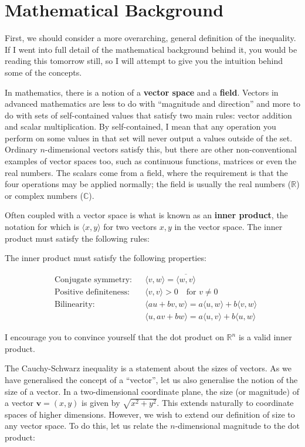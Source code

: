 \documentclass{article}
\begin{document}
\section*{Mathematical Background}

First, we should consider a more overarching, general definition of the inequality. If I went into full detail of the mathematical background behind it, you would be reading this tomorrow still, so I will attempt to give you the intuition behind some of the concepts.

In mathematics, there is a notion of a \textbf{vector space} and a \textbf{field}. Vectors in advanced mathematics are less to do with “magnitude and direction” and more to do with sets of self-contained values that satisfy two main rules: vector addition and scalar multiplication. By self-contained, I mean that any operation you perform on some values in that set will never output a values outside of the set. Ordinary $n$-dimensional vectors satisfy this, but there are other non-conventional examples of vector spaces too, such as continuous functions, matrices or even the real numbers. The scalars come from a field, where the requirement is that the four operations may be applied normally; the field is usually the real numbers ($\mathbb{R}$) or complex numbers ($\mathbb{C}$).

Often coupled with a vector space is what is known as an \textbf{inner product}, the notation for which is $\langle x,y \rangle$ for two vectors $x, y$ in the vector space. The inner product must satisfy the following rules:

The inner product must satisfy the following properties:

\begin{align*}
    &\text{Conjugate symmetry:} && \langle v, w \rangle = \overline{\langle w, v \rangle} \\
    &\text{Positive definiteness:} && \langle v, v \rangle > 0 \quad \text{for } v \neq 0 \\
    &\text{Bilinearity:} && \langle au + bv, w \rangle = a\langle u, w \rangle + b\langle v, w \rangle \\
    &&& \langle u, av + bw \rangle = a\langle u, v \rangle + b\langle u, w \rangle
\end{align*}

I encourage you to convince yourself that the dot product on $\mathbb{R}^n$ is a valid inner product.

The Cauchy-Schwarz inequality is a statement about the sizes of vectors. As we have generalised the concept of a ``vector'', let us also generalise the notion of the size of a vector. In a two-dimensional coordinate plane, the size (or magnitude) of a vector $\mathbf{v} = (x, y)$ is given by $\sqrt{x^2 + y^2}$. This extends naturally to coordinate spaces of higher dimensions. However, we wish to extend our definition of size to any vector space. To do this, let us relate the $n$-dimensional magnitude to the dot product:
\end{document}
